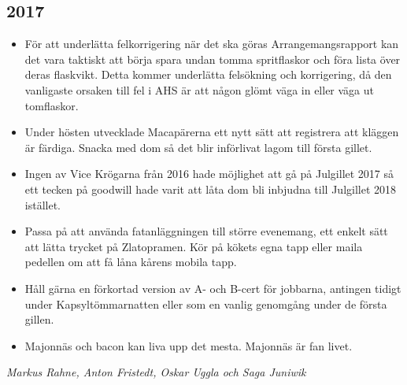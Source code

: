 \documentclass[10pt]{article}
\begin{document}
\subsection{2017}
\begin{itemize}
	\item För att underlätta felkorrigering när det ska göras Arrangemangsrapport kan det vara taktiskt att börja spara undan tomma spritflaskor och föra lista över deras flaskvikt. Detta kommer underlätta felsökning och korrigering, då den vanligaste orsaken till fel i AHS är att någon glömt väga in eller väga ut tomflaskor.
    \item Under hösten utvecklade Macapärerna ett nytt sätt att registrera att kläggen är färdiga. Snacka med dom så det blir införlivat lagom till första gillet.
    \item Ingen av Vice Krögarna från 2016 hade möjlighet att gå på Julgillet 2017 så ett tecken på goodwill hade varit att låta dom bli inbjudna till Julgillet 2018 istället.
    \item Passa på att använda fatanläggningen till större evenemang, ett enkelt sätt att lätta trycket på Zlatopramen. Kör på kökets egna tapp eller maila pedellen om att få låna kårens mobila tapp.
    \item Håll gärna en förkortad version av A- och B-cert för jobbarna, antingen tidigt under Kapsyltömmarnatten eller som en vanlig genomgång under de första gillen.
    \item Majonnäs och bacon kan liva upp det mesta. Majonnäs är fan livet.

\end{itemize}
\textit{Markus Rahne, Anton Fristedt, Oskar Uggla och Saga Juniwik}
\end{document}

